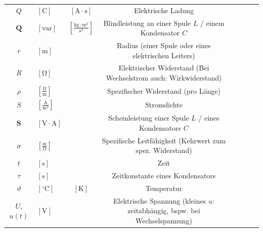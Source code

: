 \begin{raggedright}
\begin{table}[H]
{\begin{tabular}{Sl Sc Sc Sl}
        $Q$                        & $\left[\text{C}\right]$                          & $\left[\text{A}\cdot\text{s}\right]$                        & Elektrische Ladung \\
        $\mathbf{Q}$               & $\left[\text{var}\right]$                        & $\left[\tfrac{\text{kg}\cdot\text{m}^2}{\text{s}^3}\right]$ & Blindleistung an einer Spule $L$ / einem Kondensator $C$ \\
        $r$                        & $\left[\text{m}\right]$                          &                                                             & Radius (einer Spule oder eines elektrischen Leiters) \\
        $R$                        & $\left[\mathrm{\Omega}\right]$                   &                                                             & Elektrischer Widerstand (Bei Wechselstrom auch: Wirkwiderstand) \\
        $\rho$                     & $\left[\tfrac{\mathrm{\Omega}}{\text{m}}\right]$ &                                                             & Spezifischer Widerstand (pro Länge) \\
        $S$                        & $\left[\tfrac{\text{A}}{\text{m}^2}\right]$      &                                                             & Stromdichte \\
        $\mathbf{S}$               & $\left[\text{V}\cdot\text{A}\right]$             &                                                             & Scheinleistung einer Spule $L$ / eines Kondensators $C$ \\
        $\sigma$                   & $\left[\tfrac{\text{m}}{\mathrm{\Omega}}\right]$ &                                                             & Spezifische Leitfähigkeit (Kehrwert zum spez. Widerstand) \\
        $t$                        & $\left[\text{s}\right]$                          &                                                             & Zeit \\
        $\tau$                     & $\left[\text{s}\right]$                          &                                                             & Zeitkonstante eines Kondensators \\
        $\vartheta$                & $\left[^\circ\text{C}\right]$                    & $\left[\text{K}\right]$                                     & Temperatur \\
        $U$, $u(t)$                & $\left[\text{V}\right]$                          &                                                             & Elektrische Spannung (kleines $u$: zeitabhängig, bspw. bei Wechselspannung) \\

\end{tabular}}
\end{table}
\end{raggedright}
